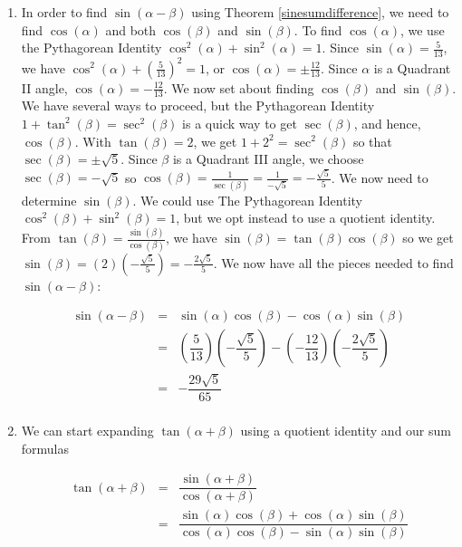 {\begin{enumerate}
\item  In order to find $\sin(\alpha - \beta)$ using Theorem \ref{sinesumdifference}, we need to find $\cos(\alpha)$ and both $\cos(\beta)$ and $\sin(\beta)$.  To find $\cos(\alpha)$, we use the Pythagorean Identity $\cos^2(\alpha) + \sin^2(\alpha) = 1$.  Since $\sin(\alpha) = \frac{5}{13}$, we have $\cos^{2}(\alpha) + \left(\frac{5}{13}\right)^2 = 1$, or $\cos(\alpha) = \pm \frac{12}{13}$.  Since $\alpha$ is a Quadrant II angle, $\cos(\alpha) = -\frac{12}{13}$. We now set about finding $\cos(\beta)$ and $\sin(\beta)$.  We have several ways to proceed, but the Pythagorean Identity $1 + \tan^{2}(\beta) = \sec^{2}(\beta)$ is a quick way to get $\sec(\beta)$, and hence, $\cos(\beta)$.  With $\tan(\beta) = 2$, we get $1 + 2^2 = \sec^{2}(\beta)$ so that $\sec(\beta) = \pm \sqrt{5}$.  Since $\beta$ is a Quadrant III angle,  we choose $\sec(\beta) =  -\sqrt{5}$ so $\cos(\beta) = \frac{1}{\sec(\beta)} = \frac{1}{-\sqrt{5}} = -\frac{\sqrt{5}}{5}$.  We now need to determine $\sin(\beta)$.  We could use The Pythagorean Identity $\cos^{2}(\beta) + \sin^{2}(\beta) = 1$, but we opt instead to use a quotient identity.  From $\tan(\beta) = \frac{\sin(\beta)}{\cos(\beta)}$, we have $\sin(\beta) = \tan(\beta) \cos(\beta)$ so we get $\sin(\beta) = (2) \left( -\frac{\sqrt{5}}{5}\right) = - \frac{2 \sqrt{5}}{5}$.  We now have all the pieces needed to find $\sin(\alpha - \beta)$:

\[ \begin{array}{rcl} 
\sin(\alpha - \beta) &  = & \sin(\alpha)\cos(\beta) - \cos(\alpha)\sin(\beta) \\
 										 & = & \left( \dfrac{5}{13} \right)\left( -\dfrac{\sqrt{5}}{5} \right) - \left( -\dfrac{12}{13} \right)\left( - \dfrac{2 \sqrt{5}}{5} \right) \\
 										 & = & -\dfrac{29\sqrt{5}}{65} \\
\end{array}\]

\item  We can start expanding $\tan(\alpha + \beta)$ using a quotient identity and our sum formulas

\[ \begin{array}{rcl}

\tan(\alpha + \beta) & = & \dfrac{\sin(\alpha + \beta)}{\cos(\alpha + \beta)} \\ [10pt]
                     & = & \dfrac{\sin(\alpha) \cos(\beta) + \cos(\alpha) \sin(\beta)}{\cos(\alpha) \cos(\beta) - \sin(\alpha) \sin(\beta)} \\ \end{array} \]
			


\end{enumerate}}
